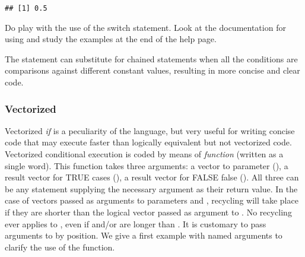 \documentclass[krantz2]{krantz}\usepackage{knitr}%
\begin{document}
\begin{knitrout}\footnotesize
{}\color{fgcolor}\begin{kframe}
\begin{alltt}
 \hlkwb{<-} 
 \hlkwb{<-} 
             \hlstd{=} \hlstd{,}
             \hlstd{=}  \hlopt{/} \hlstd{,}
             \hlstd{=}  \hlopt{/} \hlstd{,}
\hlstd{)}
\end{alltt}
\begin{verbatim}
## [1] 0.5
\end{verbatim}
\end{kframe}
\end{knitrout}

\begin{playground}
    Do play with the use of the switch statement. Look at the documentation for  using  and study the examples at the end of the help page.
\end{playground}

The  statement can substitute for chained  statements when all the conditions are comparisons against different constant values, resulting in more concise and clear code.

\subsubsection[Vectorized \texttt{ifelse()}]{Vectorized }
Vectorized \emph{if} is a peculiarity of the \Rlang language, but very useful for writing concise code that may execute faster than logically equivalent but not vectorized code.
Vectorized conditional execution is coded by means of \emph{function}  (written as a single word). This function takes three arguments: a  vector to parameter (), a result vector for TRUE cases (), a result vector for FALSE false (). All three can be any \Rlang statement supplying the necessary argument as their return value. In the case of vectors passed as arguments to parameters  and , recycling will take place if they are shorter than the logical vector passed as argument to . No recycling ever applies to , even if  and/or  are longer than . It is customary to pass arguments to  by position. We give a first example with named arguments to clarify the use of the function.
\end{document}
